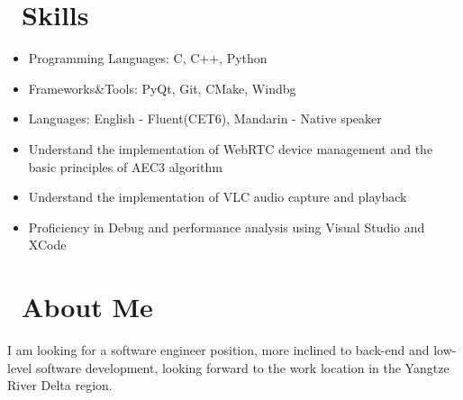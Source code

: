 \documentclass{resume}
\begin{document}

\section{\faCogs\ Skills}
\begin{itemize}
  \item Programming Languages: C, C++, Python
  \item Frameworks\&Tools: PyQt, Git, CMake, Windbg
  \item Languages: English - Fluent(CET6), Mandarin - Native speaker
  \item Understand the implementation of WebRTC device management and the basic principles of AEC3 algorithm
  \item Understand the implementation of VLC audio capture and playback
  \item Proficiency in Debug and performance analysis using Visual Studio and XCode
\end{itemize}
\section{\faGamepad\ About Me}
I am looking for a software engineer position, more inclined to back-end and low-level software development, looking forward to the work location in the Yangtze River Delta region.
%
%
\end{document}
